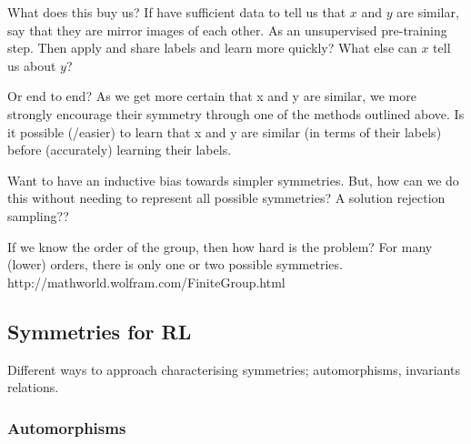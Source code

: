 

 What does this buy us? If have sufficient data to tell us that $x$ and $y$ are
 similar, say that they are mirror images of each other.
 As an unsupervised pre-training step. Then apply and share labels and learn more quickly?
 What else can $x$ tell us about $y$?

 \cite{Yang2019}

 Or end to end? As we get more certain that x and y are similar, we more strongly
 encourage their symmetry through one of the methods outlined above.
 Is it possible (/easier) to learn that x and y are similar (in terms of their labels) before (accurately) learning their labels.



 Want to have an inductive bias towards simpler symmetries. But, how can we do this without needing to represent all possible symmetries?
 A solution rejection sampling??





 If we know the order of the group, then how hard is the problem?
 For many (lower) orders, there is only one or two possible symmetries. http://mathworld.wolfram.com/FiniteGroup.html

\subsection{Symmetries for RL}\label{mdp-homomorphism}

Different ways to approach characterising symmetries; automorphisms, invariants relations.

\subsubsection{Automorphisms}

